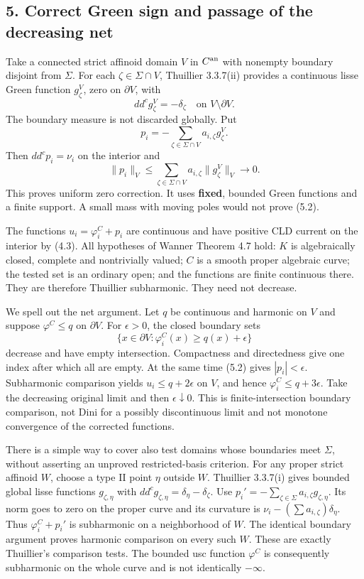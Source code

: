 \documentclass[
  10pt,
]{article}
\begin{document}
\subsection{5. Correct Green sign and passage of the decreasing
net}\label{correct-green-sign-and-passage-of-the-decreasing-net}

Take a connected strict affinoid domain \(V\) in \(C^{\rm an}\) with
nonempty boundary disjoint from \(\Sigma\). For each
\(\zeta\in\Sigma\cap V\), Thuillier 3.3.7(ii) provides a continuous
lisse Green function \(g_\zeta^V\), zero on \(\partial V\), with
\[dd^cg_\zeta^V=-\delta_\zeta\quad\text{on }V\setminus\partial V.
\] The boundary measure is not discarded globally. Put
\[p_i=-\sum_{\zeta\in\Sigma\cap V}a_{i,\zeta}g_\zeta^V.                 \tag{5.1}\]
Then \(dd^cp_i=\nu_i\) on the interior and
\[\|p_i\|_V\le\sum_{\zeta\in\Sigma\cap V}a_{i,\zeta}\|g_\zeta^V\|_V
\longrightarrow0.                                                    \tag{5.2}\]
This proves uniform zero correction. It uses \textbf{fixed}, bounded
Green functions and a finite support. A small mass with moving poles
would not prove (5.2).

The functions \(u_i=\varphi_i^C+p_i\) are continuous and have positive
CLD current on the interior by (4.3). All hypotheses of Wanner Theorem
4.7 hold: \(K\) is algebraically closed, complete and nontrivially
valued; \(C\) is a smooth proper algebraic curve; the tested set is an
ordinary open; and the functions are finite continuous there. They are
therefore Thuillier subharmonic. They need not decrease.

We spell out the net argument. Let \(q\) be continuous and harmonic on
\(V\) and suppose \(\varphi^C\le q\) on \(\partial V\). For
\(\epsilon>0\), the closed boundary sets
\[\{x\in\partial V:\varphi_i^C(x)\ge q(x)+\epsilon\}\] decrease and have
empty intersection. Compactness and directedness give one index after
which all are empty. At the same time (5.2) gives \(|p_i|<\epsilon\).
Subharmonic comparison yields \(u_i\le q+2\epsilon\) on \(V\), and hence
\(\varphi_i^C\le q+3\epsilon\). Take the decreasing original limit and
then \(\epsilon\downarrow0\). This is finite-intersection boundary
comparison, not Dini for a possibly discontinuous limit and not monotone
convergence of the corrected functions.

There is a simple way to cover also test domains whose boundaries meet
\(\Sigma\), without asserting an unproved restricted-basis criterion.
For any proper strict affinoid \(W\), choose a type II point \(\eta\)
outside \(W\). Thuillier 3.3.7(i) gives bounded global lisse functions
\(g_{\zeta,\eta}\) with \(dd^cg_{\zeta,\eta}=\delta_\eta-\delta_\zeta\).
Use \(p_i'=-\sum_{\zeta\in\Sigma}a_{i,\zeta}g_{\zeta,\eta}\). Its norm
goes to zero on the proper curve and its curvature is
\(\nu_i-(\sum a_{i,\zeta})\delta_\eta\). Thus \(\varphi_i^C+p_i'\) is
subharmonic on a neighborhood of \(W\). The identical boundary argument
proves harmonic comparison on every such \(W\). These are exactly
Thuillier's comparison tests. The bounded usc function \(\varphi^C\) is
consequently subharmonic on the whole curve and is not identically
\(-\infty\).
\end{document}
